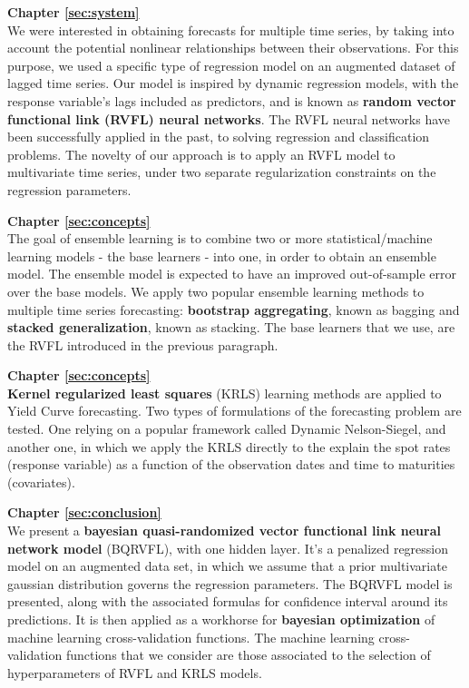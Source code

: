 \textbf{Chapter \ref{sec:system}} \\[0.2em]
We were interested in obtaining forecasts for multiple time series, by taking into account the potential nonlinear relationships between their observations. For this purpose, we used a specific type of regression model on an augmented dataset of lagged time series. Our model is inspired by dynamic regression models, with the response variable's lags included as predictors, and is known as \textbf{random vector functional link (RVFL) neural networks}. The RVFL neural networks have been successfully applied in the past, to solving regression and classification problems. The novelty of our approach is to apply an RVFL model to multivariate time series, under two separate regularization constraints on the regression parameters.

\textbf{Chapter \ref{sec:concepts}} \\[0.2em]
The goal of ensemble learning is to combine two or more statistical/machine learning models - the base learners - into one, in order to obtain an ensemble model. The ensemble model is expected to have an improved out-of-sample error over the base models. We apply two popular ensemble learning methods to multiple time series forecasting: \textbf{bootstrap aggregating}, known as bagging and \textbf{stacked generalization}, known as stacking. The base learners that we use, are the RVFL introduced in the previous paragraph.

\textbf{Chapter \ref{sec:concepts}} \\[0.2em]
\textbf{Kernel regularized least squares} (KRLS) learning methods are applied to Yield Curve forecasting. Two types of formulations of the forecasting problem are tested. One relying on a popular framework called Dynamic Nelson-Siegel, and another one, in which we apply the KRLS directly to the explain the spot rates (response variable) as a function of the observation dates and time to maturities (covariates).

\textbf{Chapter \ref{sec:conclusion}} \\[0.2em]
We present a \textbf{bayesian quasi-randomized vector functional link neural network model} (BQRVFL), with one hidden layer. It's a penalized regression model on an augmented data set, in which we assume that a prior multivariate gaussian distribution governs the regression parameters. The BQRVFL model is presented, along with the associated formulas for confidence interval around its predictions. It is then applied as a workhorse for \textbf{bayesian optimization} of machine learning cross-validation functions. The machine learning cross-validation functions that we consider are those associated to the selection of hyperparameters of RVFL and KRLS models.
